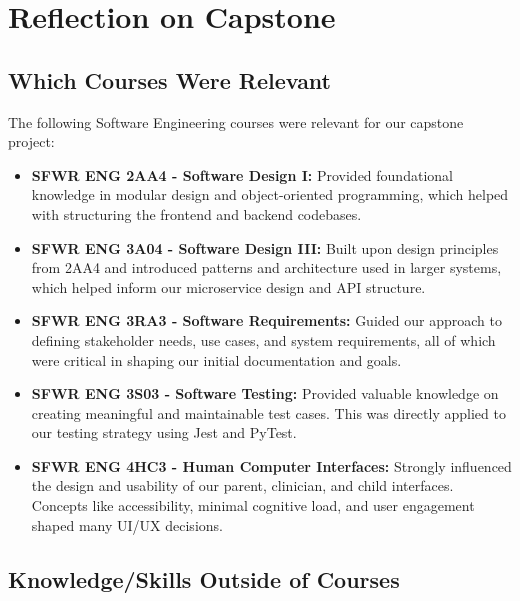 \documentclass{article}
\begin{document}
\section{Reflection on Capstone}


\subsection{Which Courses Were Relevant}

The following Software Engineering courses were relevant for our capstone project: 

\begin{itemize}
    \item \textbf{SFWR ENG 2AA4 - Software Design I:} Provided foundational knowledge in modular design and object-oriented programming, which helped with structuring the frontend and backend codebases.
    
    \item \textbf{SFWR ENG 3A04 - Software Design III:} Built upon design principles from 2AA4 and introduced patterns and architecture used in larger systems, which helped inform our microservice design and API structure.
    
    \item \textbf{SFWR ENG 3RA3 - Software Requirements:} Guided our approach to defining stakeholder needs, use cases, and system requirements, all of which were critical in shaping our initial documentation and goals.
    
    \item \textbf{SFWR ENG 3S03 - Software Testing:} Provided valuable knowledge on creating meaningful and maintainable test cases. This was directly applied to our testing strategy using Jest and PyTest.
    
    \item \textbf{SFWR ENG 4HC3 - Human Computer Interfaces:} Strongly influenced the design and usability of our parent, clinician, and child interfaces. Concepts like accessibility, minimal cognitive load, and user engagement shaped many UI/UX decisions.
\end{itemize}


\subsection{Knowledge/Skills Outside of Courses}
\end{document}

